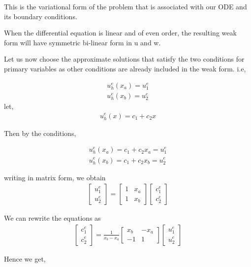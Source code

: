 This is the variational form of the problem that is associated with our ODE and its boundary conditions.

When the differential equation is linear and of even order, the resulting weak form will have symmetric bi-linear form in u and w.
 	


Let us now choose the approximate solutions that satisfy the two conditions for primary variables as other conditions are already included in the weak form. 
i.e,

\begin{eqnarray}
	u_h^{e} (x_a) = u_1^{e} \\
	u_h^{e} (x_b) = u_2^{e}  
\end{eqnarray}
let,
\begin{eqnarray}
	u_h^{e} (x) = c_1 + c_2 x
\end{eqnarray}

Then by the conditions,

\begin{eqnarray}
	u_h^{e} (x_a) = c_1 + c_2 x_a = u_1^{e}\\
	u_h^{e} (x_b) = c_1 + c_2 x_b = u_2^{e}
\end{eqnarray}

writing in matrix form, we obtain
\begin{eqnarray}
\begin{bmatrix}
	u_1^{e}\\
	u_2^{e}
\end{bmatrix}
=
\begin{bmatrix}
	1 & x_a\\
	1 & x_b
\end{bmatrix}
\begin{bmatrix}
	c_1^{e}\\
	c_2^{e}
\end{bmatrix}
\end{eqnarray}

We can rewrite the equations as 
\begin{eqnarray}
	\begin{bmatrix}
		c_1^{e}\\
		c_2^{e}
	\end{bmatrix}
	= \frac{1}{x_b - x_a}
	\begin{bmatrix}
		x_b & -x_a\\
		-1 & 1
	\end{bmatrix}
	\begin{bmatrix}
		u_1^{e}\\
		u_2^{e}
	\end{bmatrix}
\end{eqnarray}

Hence we get,

